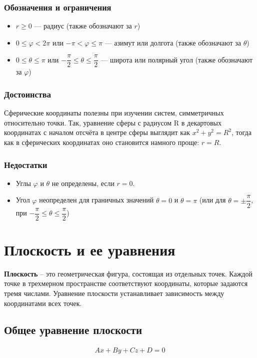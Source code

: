 \documentclass[a4paper,12pt]{extbook}
\theoremstyle{numbered}
\theoremstyle{named}
\theoremstyle{named}
\theoremstyle{named}
\begin{document}
\subsubsection*{Обозначения и ограничения}
\begin{itemize}
    \item {\(r \geq 0\) — радиус (также обозначают за \(r\))}
    \item {\(0 \leq \varphi < 2\pi\) или \(-\pi < \varphi \leq \pi\) — азимут или долгота (также обозначают за \(\theta\))}
    \item {\(0 \leq \theta \leq \pi\) или \(-\dfrac{\pi}{2} \leq \theta \leq \dfrac{\pi}{2}\) — широта или полярный угол (также обозначают за \(\varphi\))}
\end{itemize}

\subsubsection*{Достоинства}
Сферические координаты полезны при изучении систем, симметричных относительно точки. Так, уравнение сферы с радиусом R в декартовых координатах с началом отсчёта в центре сферы выглядит как \(x^2 + y^2 = R^2\), тогда как в сферических координатах оно становится намного проще: \(r = R\).

\subsubsection*{Недостатки}
\begin{itemize}
    \item Углы \(\varphi\) и \(\theta\) не определены, если \(r = 0\).
    \item Угол \(\varphi\) неопределен для граничных значений \(\theta = 0\) и \(\theta = \pi\) (или для \(\theta = \pm \dfrac{\pi}{2}\), при \(-\dfrac{\pi}{2} \leq \theta \leq \dfrac{\pi}{2}\))
\end{itemize}

\section{Плоскость и ее уравнения}\label{sec:plane}

\textbf{Плоскость} – это геометрическая фигура, состоящая из отдельных точек. Каждой точке в трехмерном пространстве соответствуют координаты, которые задаются тремя числами. Уравнение плоскости устанавливает зависимость между координатами всех точек.

\subsection*{Общее уравнение плоскости}
\begin{gather*}
    Ax + By + Cz + D = 0
\end{gather*}
\end{document}

